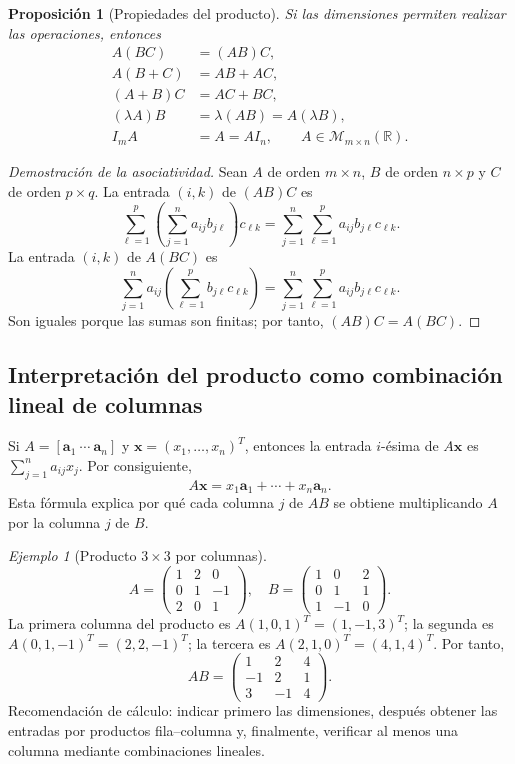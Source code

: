 \documentclass[12pt]{article}
\newtheorem{proposicion}[definicion]{Proposición}
\theoremstyle{remark}
\newtheorem{ejemplo}[definicion]{Ejemplo}
\newcommand{\R}{\mathbb{R}}
\newcommand{\Mat}[2]{\mathcal{M}_{#1\times #2}}
\newcommand{\vect}[1]{\boldsymbol{#1}}
\begin{document}
\begin{proposicion}[Propiedades del producto]
Si las dimensiones permiten realizar las operaciones, entonces
\begin{align*}
A(BC)&=(AB)C,\\
A(B+C)&=AB+AC,\\
(A+B)C&=AC+BC,\\
(\lambda A)B&=\lambda(AB)=A(\lambda B),\\
I_mA&=A=AI_n,\qquad A\in\Mat{m}{n}(\R).
\end{align*}
\end{proposicion}
\begin{proof}[Demostración de la asociatividad]
Sean $A$ de orden $m\times n$, $B$ de orden $n\times p$ y $C$ de orden $p\times q$. La entrada $(i,k)$ de $(AB)C$ es
\[
\sum_{\ell=1}^{p}\left(\sum_{j=1}^{n}a_{ij}b_{j\ell}\right)c_{\ell k}
=\sum_{j=1}^{n}\sum_{\ell=1}^{p}a_{ij}b_{j\ell}c_{\ell k}.
\]
La entrada $(i,k)$ de $A(BC)$ es
\[
\sum_{j=1}^{n}a_{ij}\left(\sum_{\ell=1}^{p}b_{j\ell}c_{\ell k}\right)
=\sum_{j=1}^{n}\sum_{\ell=1}^{p}a_{ij}b_{j\ell}c_{\ell k}.
\]
Son iguales porque las sumas son finitas; por tanto, $(AB)C=A(BC)$.
\end{proof}
\subsection*{Interpretación del producto como combinación lineal de columnas}
Si $A=[\vect a_1\ \cdots\ \vect a_n]$ y $\vect x=(x_1,\ldots,x_n)^T$, entonces la entrada $i$-ésima de $A\vect x$ es $\sum_{j=1}^na_{ij}x_j$. Por consiguiente,
\[
\boxed{A\vect x=x_1\vect a_1+\cdots+x_n\vect a_n.}
\]
Esta fórmula explica por qué cada columna $j$ de $AB$ se obtiene multiplicando $A$ por la columna $j$ de $B$.
\begin{ejemplo}[Producto $3\times3$ por columnas]
\[
A=\begin{pmatrix}1&2&0\\0&1&-1\\2&0&1\end{pmatrix},\quad
B=\begin{pmatrix}1&0&2\\0&1&1\\1&-1&0\end{pmatrix}.
\]
La primera columna del producto es $A(1,0,1)^T=(1,-1,3)^T$; la segunda es $A(0,1,-1)^T=(2,2,-1)^T$; la tercera es $A(2,1,0)^T=(4,1,4)^T$. Por tanto,
\[
\boxed{AB=\begin{pmatrix}1&2&4\\-1&2&1\\3&-1&4\end{pmatrix}.}
\]
Recomendación de cálculo: indicar primero las dimensiones, después obtener las entradas por productos fila--columna y, finalmente, verificar al menos una columna mediante combinaciones lineales.
\end{ejemplo}
\end{document}
